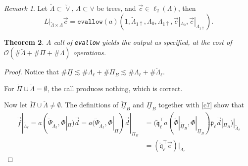 \documentclass{amsart}
\newtheorem{theorem}{Theorem}[section]
\theoremstyle{definition}
\theoremstyle{remark}
\newtheorem{remark}[theorem]{Remark}
\numberwithin{equation}{section}
\newcommand{\1}{\mathbb 1}
\begin{document}
 
 \begin{remark} \label{rem3}
 Let $\breve{\Lambda} \subset \breve{\vee}$, $\Lambda \subset \vee$ be trees, and $\vec{c} \in \ell_2(\Lambda)$, then 
 $$
 L|_{\breve{\Lambda} \times \Lambda} \vec{c}=
\mathtt{evallow}(a)(1,\breve{\Lambda}_{1 \uparrow},\Lambda_0,\Lambda_{1 \uparrow},\vec{c}|_{\Lambda_0},\vec{c}|_{\Lambda_{1 \uparrow}}).
 $$
\end{remark}
 \newpage

\begin{theorem} A call of \texttt{evallow} yields the output as specified, at the cost of
 ${\mathcal O}(\# \breve{\Lambda}+\# \Pi+\# \Lambda)$ operations.
 
 \end{theorem}
 
 \begin{proof}
Notice that
 $\# \underline{\Pi}  \lesssim \#\Lambda_\ell+\#\Pi_B \lesssim  \#\Lambda_\ell+\#\breve{\Lambda}_\ell$.

 For $\breve{\Pi} \cup \breve{\Lambda}= \emptyset$, the call produces nothing, which is correct.
  

Now let  $\breve{\Pi} \cup \breve{\Lambda}\neq \emptyset$. The definitions of $\underline{\breve{\Pi}}_B$ and $\underline{\Pi}_B$ together with \eqref{c7} show that \begin{align*}
\vec{f}|_{\breve{\Lambda}_\ell} = a(\breve{\Psi}_{\breve{\Lambda}_\ell},\Phi|_{\Pi})\vec{d}= a(\breve{\Psi}_{\breve{\Lambda}_\ell},\Phi|_{\Pi})\vec{d}|_{\Pi_B}&=(\mathfrak{\breve{q}}_\ell^\top a(\breve{\Phi}|_{\underline{\breve{\Pi}}_B},\Phi|_{\underline{\Pi}_B})\mathfrak{p}_{\ell} \vec{d}|_{\Pi_B})|_{\breve{\Lambda}_{\ell}}\\
&=(\mathfrak{\breve{q}}_\ell^\top \underline{\vec{e}})|_{\breve{\Lambda}_{\ell}}
\end{align*}


\end{proof}
\end{document}
